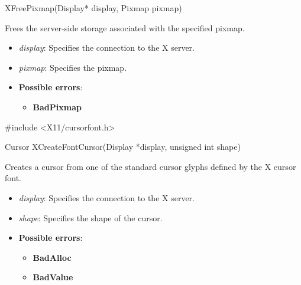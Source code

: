\documentclass{report}
\begin{document}
\begin{itemize}
            \begin{cppcode}
                XFreePixmap(Display* display, Pixmap pixmap)
            \end{cppcode}
            \bigbreak \noindent
            Frees the server-side storage associated with the specified pixmap.

            \begin{itemize}
                \item \textit{display}: Specifies the connection to the X server.
                \item \textit{pixmap}: Specifies the pixmap.
            \end{itemize}

            \begin{itemize}
                \item \textbf{Possible errors}:
                    \begin{itemize}
                        \item \textbf{BadPixmap}
                    \end{itemize}
            \end{itemize}

            \begin{cppcode}
                #include <X11/cursorfont.h>

                Cursor XCreateFontCursor(Display *display, unsigned int shape)
            \end{cppcode}
            \bigbreak \noindent
            Creates a cursor from one of the standard cursor glyphs defined by the X cursor font.
            \begin{itemize}
                \item \textit{display}: Specifies the connection to the X server.
                \item \textit{shape}: Specifies the shape of the cursor.
            \end{itemize}
            \begin{itemize}
                \item \textbf{Possible errors}:
                    \begin{itemize}
                        \item \textbf{BadAlloc}
                        \item \textbf{BadValue}
                    \end{itemize}
            \end{itemize}


\end{itemize}
\end{document}
